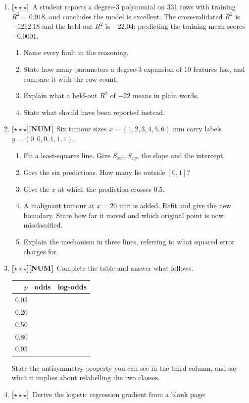 \documentclass[11pt,a4paper]{article}
\newcommand{\LA}{{\footnotesize\textbf{[$\star\star\star$]}}}
\newcommand{\NUM}{{\footnotesize\textbf{[NUM]}}}
\newcommand{\Q}[1]{\item[\textbf{#1}]}
\begin{document}
\begin{enumerate}[leftmargin=2.2cm]
\Q{U5.58}\LA\ A student reports a degree-3 polynomial on 331 rows with
  training $R^2 = 0.918$, and concludes the model is excellent. The
  cross-validated $R^2$ is $-1212.18$ and the held-out $R^2$ is $-22.04$;
  predicting the training mean scores $-0.0001$.
  \begin{enumerate}[label=(\alph*)]
    \item Name every fault in the reasoning.
    \item State how many parameters a degree-3 expansion of 10 features has,
      and compare it with the row count.
    \item Explain what a held-out $R^2$ of $-22$ means in plain words.
    \item State what should have been reported instead.
  \end{enumerate}
\Q{U5.59}\LA\NUM\ Six tumour sizes $x = (1,2,3,4,5,6)$ mm carry labels
  $y = (0,0,0,1,1,1)$.
  \begin{enumerate}[label=(\alph*)]
    \item Fit a least-squares line. Give $S_{xx}$, $S_{xy}$, the slope and
      the intercept.
    \item Give the six predictions. How many lie outside $[0,1]$?
    \item Give the $x$ at which the prediction crosses $0.5$.
    \item A malignant tumour at $x = 20$ mm is added. Refit and give the new
      boundary. State how far it moved and which original point is now
      misclassified.
    \item Explain the mechanism in three lines, referring to what squared
      error charges for.
  \end{enumerate}
\Q{U5.60}\LA\NUM\ Complete the table and answer what follows.
  \begin{center}\begin{tabular}{@{}rrr@{}}\toprule
  $p$ & odds & log-odds\\
  \midrule
  0.05 & & \\ 0.20 & & \\ 0.50 & & \\ 0.80 & & \\ 0.95 & & \\
  \bottomrule\end{tabular}\end{center}
  State the antisymmetry property you can see in the third column, and say
  what it implies about relabelling the two classes.
\Q{U5.61}\LA\ Derive the logistic regression gradient from a blank page:

\end{enumerate}
\end{document}
